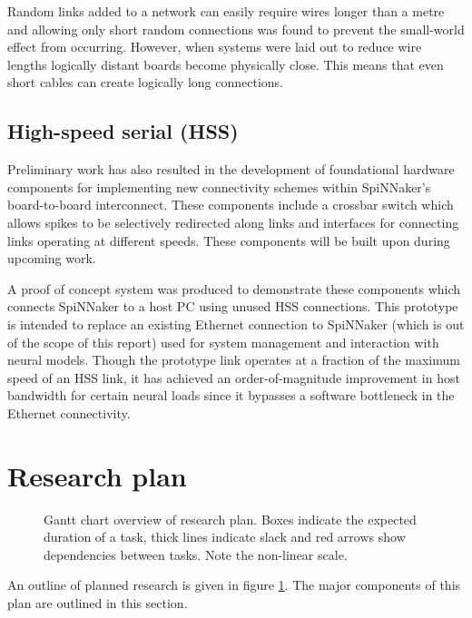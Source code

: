 		Random links added to a network can easily require wires longer than a metre
		and allowing only short random connections was found to prevent the
		small-world effect from occurring. However, when systems were laid out to
		reduce wire lengths logically distant boards become physically close. This
		means that even short cables can create logically long connections.
	
	
	\subsection{High-speed serial (HSS)}
		
		Preliminary work has also resulted in the development of foundational
		hardware components for implementing new connectivity schemes within
		SpiNNaker's board-to-board interconnect. These components include a crossbar
		switch \cite{dally04} which allows spikes to be selectively redirected along
		links and interfaces for connecting links operating at different speeds.
		These components will be built upon during upcoming work.
		
		A proof of concept system was produced to demonstrate these components which
		connects SpiNNaker to a host PC using unused HSS connections. This prototype
		is intended to replace an existing Ethernet connection to SpiNNaker (which
		is out of the scope of this report) used for system management and
		interaction with neural models. Though the prototype link operates at a
		fraction of the maximum speed of an HSS link, it has achieved an
		order-of-magnitude improvement in host bandwidth for certain neural loads
		since it bypasses a software bottleneck in the Ethernet connectivity.


\section{Research plan}
	
	\begin{figure}
		\center
		
		
		\caption{Gantt chart overview of research plan. Boxes indicate the expected
		duration of a task, thick lines indicate slack and red arrows show
		dependencies between tasks. Note the non-linear scale.}
		\label{fig:plan-gantt}
	\end{figure}
	
	An outline of planned research is given in figure \ref{fig:plan-gantt}. The
	major components of this plan are outlined in this section.
	
